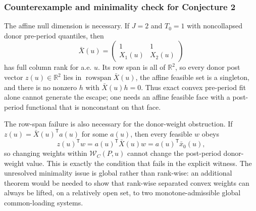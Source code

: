 \documentclass[11pt]{article}
\newcommand{\transpose}{\mathsf{T}}
\newcommand{\R}{\mathbb{R}}
\theoremstyle{definition}
\theoremstyle{plain}
\theoremstyle{remark}
\begin{document}
\subsubsection*{Counterexample and minimality check for Conjecture 2}
The affine null dimension is necessary.  If \(J=2\) and \(T_0=1\) with noncollapsed donor pre-period quantiles, then
\[
\bar X(u)=\begin{pmatrix}1&1\\ X_1(u)&X_2(u)\end{pmatrix}
\]
has full column rank for a.e. \(u\).  Its row span is all of \(\R^2\), so every donor post vector \(z(u)\in\R^2\) lies in \(\operatorname{rowspan}\bar X(u)\), the affine feasible set is a singleton, and there is no nonzero \(h\) with \(\bar X(u)h=0\).  Thus exact convex pre-period fit alone cannot generate the escape; one needs an affine feasible face with a post-period functional that is nonconstant on that face.

The row-span failure is also necessary for the donor-weight obstruction.  If \(z(u)=\bar X(u)^\transpose a(u)\) for some \(a(u)\), then every feasible \(w\) obeys
\[
z(u)^\transpose w=a(u)^\transpose\bar X(u)w=a(u)^\transpose\bar x_0(u),
\]
so changing weights within \(\mathcal{W}_C(P,u)\) cannot change the post-period donor-weight value.  This is exactly the condition that fails in the explicit witness.  The unresolved minimality issue is global rather than rank-wise: an additional theorem would be needed to show that rank-wise separated convex weights can always be lifted, on a relatively open set, to two monotone-admissible global common-loading systems.
\end{document}

